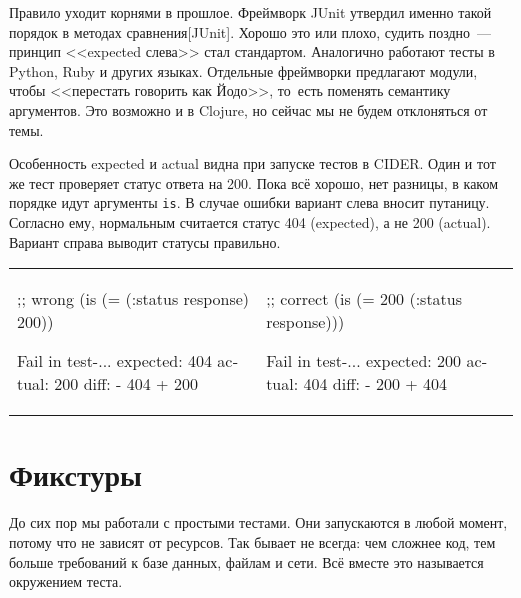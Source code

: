 
Правило уходит корнями в прошлое. Фреймворк JUnit утвердил именно такой порядок
в методах сравнения[JUnit].
Хорошо это или плохо, судить поздно~--- принцип <<expected слева>> стал
стандартом. Аналогично работают тесты в Python, Ruby и других языках. Отдельные
фреймворки предлагают модули, чтобы <<перестать говорить как Йодо>>, то~есть
поменять семантику аргументов. Это возможно и в Clojure, но сейчас мы не будем
отклоняться от темы.


Особенность expected и actual видна при запуске тестов в CIDER. Один и тот же
тест проверяет статус ответа на 200. Пока всё хорошо, нет разницы, в каком
порядке идут аргументы \verb|is|. В случае ошибки вариант слева вносит
путаницу. Согласно ему, нормальным считается статус 404 (expected), а не 200
(actual). Вариант справа выводит статусы правильно.

\noindent
\begin{tabular}{ @{}p{5cm} @{}p{5cm} }

\begin{english}
  \begin{clojure}
;; wrong
(is (= (:status response) 200))

Fail in test-...
expected: 404
  actual: 200
    diff: - 404
          + 200
  \end{clojure}
\end{english}

&

\begin{english}
  \begin{clojure}
;; correct
(is (= 200 (:status response)))

Fail in test-...
expected: 200
  actual: 404
    diff: - 200
          + 404
  \end{clojure}
\end{english}

\end{tabular}

\section{Фикстуры}


До сих пор мы работали с простыми тестами. Они запускаются в любой момент,
потому что не зависят от ресурсов. Так бывает не всегда: чем сложнее код, тем
больше требований к базе данных, файлам и сети. Всё вместе это называется
окружением теста.

